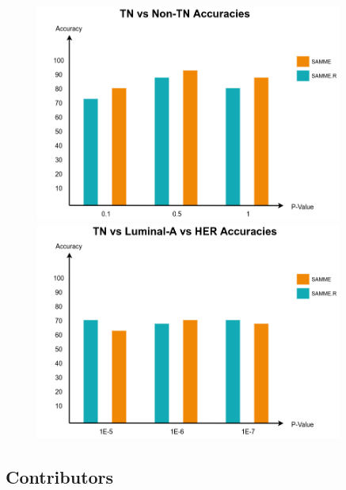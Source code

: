 \documentclass[final,1p,times,twocolumn]{elsarticle}
\begin{document}
\begin{figure}
    \centering
    \begin{minipage}{0.45\textwidth}
        \centering
        \includegraphics[width=0.9\textwidth]{acc1.png} %
    \end{minipage}\hfill
    \begin{minipage}{0.45\textwidth}
        \centering
        \includegraphics[width=0.9\textwidth]{acc2.png} %
    \end{minipage}
\end{figure}


\subsection{Contributors}

\end{document}
